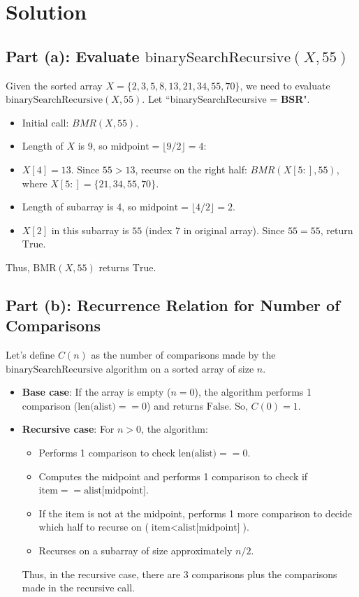 \documentclass{article}
\begin{document}
\section*{Solution}

\subsection*{Part (a): Evaluate $\mathrm{binarySearchRecursive}(X, 55)$}

Given the sorted array $X = \{2, 3, 5, 8, 13, 21, 34, 55, 70\}$, we need to evaluate $\mathrm{binarySearchRecursive}(X, 55)$.
Let ``binarySearchRecursive = {\bf BSR}". 
\begin{itemize}
    \item Initial call: $BMR(X, 55)$.
    \item Length of $X$ is 9, so $\text{midpoint} = \lfloor 9/2 \rfloor = 4$: 
    \item $X[4] = 13$. Since $55 > 13$, recurse on the right half: $BMR(X[5:], 55)$, where  $X[5:] = \{21, 34, 55, 70\}$.
    \item Length of subarray is 4, so $\text{midpoint} = \lfloor 4/2 \rfloor = 2$.
    \item $X[2]$ in this subarray is $55$ (index 7 in original array). Since $55 = 55$, return $\text{True}$.
\end{itemize}

Thus, $\mathrm{BMR}(X, 55)$ returns $\boxed{\text{True}}$.

\subsection*{Part (b): Recurrence Relation for Number of Comparisons}

Let’s define $C(n)$ as the number of comparisons made by the $\mathrm{binarySearchRecursive}$ algorithm on a sorted array of size $n$.

\begin{itemize}
    \item \textbf{Base case}: If the array is empty ($n = 0$), the algorithm performs 1 comparison ($\text{len(alist)} == 0$) and returns $\text{False}$. So, $C(0) = 1$.
    \item \textbf{Recursive case}: For $n > 0$, the algorithm:
        \begin{itemize}
            \item Performs 1 comparison to check $\text{len(alist)} == 0$.
            \item Computes the midpoint and performs 1 comparison to check if $\text{item} == \text{alist[midpoint]}$.
            \item If the item is not at the midpoint, performs 1 more comparison to decide which half to recurse on ($\text{item} < \text{alist[midpoint]}$).
            \item Recurses on a subarray of size approximately $n/2$.
        \end{itemize}
    Thus, in the recursive case, there are 3 comparisons plus the comparisons made in the recursive call.
\end{itemize}
\end{document}
